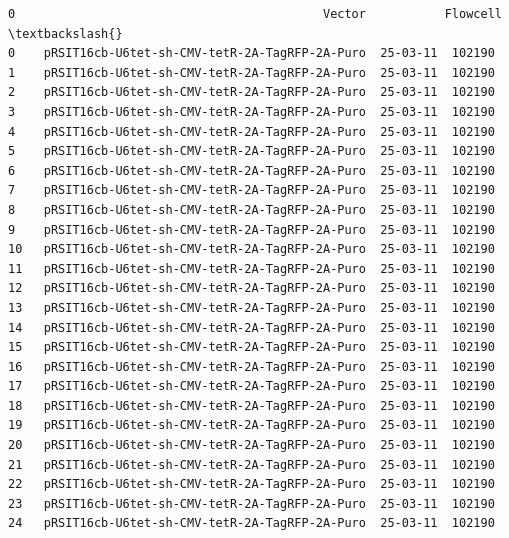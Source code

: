 \documentclass[11pt]{article}
\begin{document}
\begin{Verbatim}[commandchars=\\\{\}]
0                                           Vector           Flowcell  \textbackslash{}
0    pRSIT16cb-U6tet-sh-CMV-tetR-2A-TagRFP-2A-Puro  25-03-11  102190    
1    pRSIT16cb-U6tet-sh-CMV-tetR-2A-TagRFP-2A-Puro  25-03-11  102190    
2    pRSIT16cb-U6tet-sh-CMV-tetR-2A-TagRFP-2A-Puro  25-03-11  102190    
3    pRSIT16cb-U6tet-sh-CMV-tetR-2A-TagRFP-2A-Puro  25-03-11  102190    
4    pRSIT16cb-U6tet-sh-CMV-tetR-2A-TagRFP-2A-Puro  25-03-11  102190    
5    pRSIT16cb-U6tet-sh-CMV-tetR-2A-TagRFP-2A-Puro  25-03-11  102190    
6    pRSIT16cb-U6tet-sh-CMV-tetR-2A-TagRFP-2A-Puro  25-03-11  102190    
7    pRSIT16cb-U6tet-sh-CMV-tetR-2A-TagRFP-2A-Puro  25-03-11  102190    
8    pRSIT16cb-U6tet-sh-CMV-tetR-2A-TagRFP-2A-Puro  25-03-11  102190    
9    pRSIT16cb-U6tet-sh-CMV-tetR-2A-TagRFP-2A-Puro  25-03-11  102190    
10   pRSIT16cb-U6tet-sh-CMV-tetR-2A-TagRFP-2A-Puro  25-03-11  102190    
11   pRSIT16cb-U6tet-sh-CMV-tetR-2A-TagRFP-2A-Puro  25-03-11  102190    
12   pRSIT16cb-U6tet-sh-CMV-tetR-2A-TagRFP-2A-Puro  25-03-11  102190    
13   pRSIT16cb-U6tet-sh-CMV-tetR-2A-TagRFP-2A-Puro  25-03-11  102190    
14   pRSIT16cb-U6tet-sh-CMV-tetR-2A-TagRFP-2A-Puro  25-03-11  102190    
15   pRSIT16cb-U6tet-sh-CMV-tetR-2A-TagRFP-2A-Puro  25-03-11  102190    
16   pRSIT16cb-U6tet-sh-CMV-tetR-2A-TagRFP-2A-Puro  25-03-11  102190    
17   pRSIT16cb-U6tet-sh-CMV-tetR-2A-TagRFP-2A-Puro  25-03-11  102190    
18   pRSIT16cb-U6tet-sh-CMV-tetR-2A-TagRFP-2A-Puro  25-03-11  102190    
19   pRSIT16cb-U6tet-sh-CMV-tetR-2A-TagRFP-2A-Puro  25-03-11  102190    
20   pRSIT16cb-U6tet-sh-CMV-tetR-2A-TagRFP-2A-Puro  25-03-11  102190    
21   pRSIT16cb-U6tet-sh-CMV-tetR-2A-TagRFP-2A-Puro  25-03-11  102190    
22   pRSIT16cb-U6tet-sh-CMV-tetR-2A-TagRFP-2A-Puro  25-03-11  102190    
23   pRSIT16cb-U6tet-sh-CMV-tetR-2A-TagRFP-2A-Puro  25-03-11  102190    
24   pRSIT16cb-U6tet-sh-CMV-tetR-2A-TagRFP-2A-Puro  25-03-11  102190    


\end{Verbatim}
\end{document}
